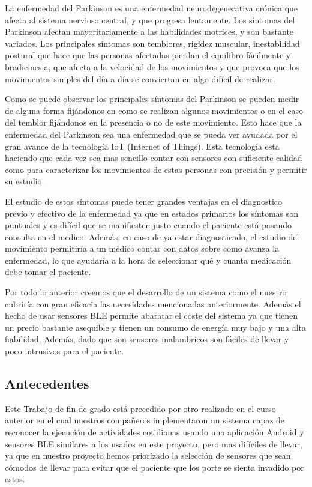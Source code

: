 \documentclass[11pt,spanish]{article}
\begin{document}
La enfermedad del Parkinson es una enfermedad neurodegenerativa crónica que afecta al sistema nervioso central, y que progresa lentamente. Los síntomas del Parkinson afectan mayoritariamente a las habilidades motrices, y son bastante variados. Los principales síntomas son temblores, rigidez muscular, inestabilidad postural que hace que las personas afectadas pierdan el equilibro fácilmente y bradicinesia, que afecta a la velocidad de los movimientos y que provoca que los movimientos simples del día a día se conviertan en algo difícil de realizar.
\newline

Como se puede observar los principales síntomas del Parkinson se pueden medir de alguna forma fijándonos en como se realizan algunos movimientos o en el caso del temblor fijándonos en la presencia o no de este movimiento. Esto hace que la enfermedad del Parkinson sea una enfermedad que se pueda ver ayudada por el gran avance de la tecnología IoT (Internet of Things). Esta tecnología esta haciendo que cada vez sea mas sencillo contar con sensores con suficiente calidad como para caracterizar los movimientos de estas personas con precisión y permitir su estudio.
\newline

El estudio de estos síntomas puede tener grandes ventajas en el diagnostico previo y efectivo de la enfermedad ya que en estados primarios los síntomas son puntuales y es difícil que se manifiesten justo cuando el paciente está pasando consulta en el medico. Además, en caso de ya estar diagnosticado, el estudio del movimiento permitiría a un médico contar con datos sobre como avanza la enfermedad, lo que ayudaría a la hora de seleccionar qué y cuanta medicación debe tomar el paciente.
\newline

Por todo lo anterior creemos que el desarrollo de un sistema como el nuestro cubriría con gran eficacia las necesidades mencionadas anteriormente. Además el hecho de usar sensores BLE permite abaratar el coste del sistema ya que tienen un precio bastante asequible y tienen un consumo de energía muy bajo y una alta fiabilidad. Además, dado que son sensores inalambricos son fáciles de llevar y poco intrusivos para el paciente.

\subsection{Antecedentes}

Este Trabajo de fin de grado está precedido por otro realizado en el curso anterior \cite{TFG_Anterior}  en el cual nuestros compañeros implementaron un sistema capaz de reconocer la ejecución de actividades cotidianas usando una aplicación Android y sensores BLE similares a los usados en este proyecto, pero mas difíciles de llevar, ya que en nuestro proyecto hemos priorizado la selección de sensores que sean cómodos de llevar para evitar que el paciente que los porte se sienta invadido por estos. 
\newline
\end{document}
